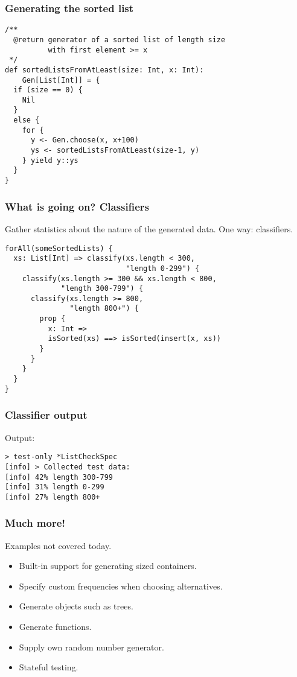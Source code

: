 \begin{frame}[fragile]
  \frametitle{Generating the sorted list}

  \begin{verbatim}
/**
  @return generator of a sorted list of length size
          with first element >= x
 */
def sortedListsFromAtLeast(size: Int, x: Int):
    Gen[List[Int]] = {
  if (size == 0) {
    Nil
  }
  else {
    for {
      y <- Gen.choose(x, x+100)
      ys <- sortedListsFromAtLeast(size-1, y)
    } yield y::ys
  }
}
  \end{verbatim}
\end{frame}

\begin{frame}[fragile]
  \frametitle{What is going on? Classifiers}

  Gather statistics about the nature of the generated data. One way: classifiers.

  \begin{verbatim}
forAll(someSortedLists) {
  xs: List[Int] => classify(xs.length < 300,
                            "length 0-299") {
    classify(xs.length >= 300 && xs.length < 800,
             "length 300-799") {
      classify(xs.length >= 800,
               "length 800+") {
        prop {
          x: Int =>
          isSorted(xs) ==> isSorted(insert(x, xs))
        }
      }
    }
  }
}
  \end{verbatim}
\end{frame}

\begin{frame}[fragile]
  \frametitle{Classifier output}

  Output:
  \begin{verbatim}
> test-only *ListCheckSpec
[info] > Collected test data:
[info] 42% length 300-799
[info] 31% length 0-299
[info] 27% length 800+
  \end{verbatim}
\end{frame}

\begin{frame}[fragile]
  \frametitle{Much more!}

  Examples not covered today.

  \begin{itemize}
    \item<1-> Built-in support for generating sized containers.
    \item<2-> Specify custom frequencies when choosing alternatives.
    \item<3-> Generate objects such as trees.
    \item<4-> Generate functions.
    \item<5-> Supply own random number generator.
    \item<6-> Stateful testing.
  \end{itemize}
\end{frame}

